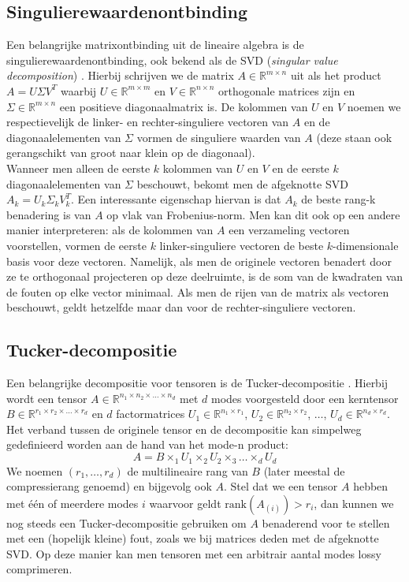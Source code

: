 \subsection{Singulierewaardenontbinding}

Een belangrijke matrixontbinding uit de lineaire algebra is de singulierewaardenontbinding, ook bekend als de SVD (\textit{singular value decomposition}) \cite{ref:svd}. Hierbij schrijven we de matrix $A \in \mathbb{R}^{m \times n}$ uit als het product $A = U \Sigma V^T$ waarbij $U \in \mathbb{R}^{m \times m}$ en $V \in \mathbb{R}^{n \times n}$ orthogonale matrices zijn en $\Sigma \in \mathbb{R}^{m \times n}$ een positieve diagonaalmatrix is. De kolommen van $U$ en $V$ noemen we respectievelijk de linker- en rechter-singuliere vectoren van $A$ en de diagonaalelementen van $\Sigma$ vormen de singuliere waarden van $A$ (deze staan ook gerangschikt van groot naar klein op de diagonaal).\\

Wanneer men alleen de eerste $k$ kolommen van $U$ en $V$ en de eerste $k$ diagonaalelementen van $\Sigma$ beschouwt, bekomt men de afgeknotte SVD $A_k = U_k \Sigma_k V_k^T$. Een interessante eigenschap hiervan is dat $A_k$ de beste rang-k benadering is van $A$ op vlak van Frobenius-norm. Men kan dit ook op een andere manier interpreteren: als de kolommen van $A$ een verzameling vectoren voorstellen, vormen de eerste $k$ linker-singuliere vectoren de beste $k$-dimensionale basis voor deze vectoren. Namelijk, als men de originele vectoren benadert door ze te orthogonaal projecteren op deze deelruimte, is de som van de kwadraten van de fouten op elke vector minimaal. Als men de rijen van de matrix als vectoren beschouwt, geldt hetzelfde maar dan voor de rechter-singuliere vectoren.

\subsection{Tucker-decompositie}

Een belangrijke decompositie voor tensoren is de Tucker-decompositie \cite{ref:tucker}. Hierbij wordt een tensor $A \in \mathbb{R}^{n_1 \times n_2 \times \dots \times n_d}$ met $d$ modes voorgesteld door een kerntensor $B \in \mathbb{R}^{r_1 \times r_2 \times \dots \times r_d}$ en $d$ factormatrices $U_1 \in \mathbb{R}^{n_1 \times r_1}$, $U_2 \in \mathbb{R}^{n_2 \times r_2}$, $\dots$, $U_d \in \mathbb{R}^{n_d \times r_d}$. Het verband tussen de originele tensor en de decompositie kan simpelweg gedefinieerd worden aan de hand van het mode-n product:
\[
A = B \times_1 U_1 \times_2 U_2 \times_3 \dots \times_d U_d
\]
We noemen $(r_1, \dots, r_d)$ de multilineaire rang van $B$ (later meestal de compressierang genoemd) en bijgevolg ook $A$. Stel dat we een tensor $A$ hebben met \'e\'en of meerdere modes $i$ waarvoor geldt $\text{rank}(A_{(i)}) > r_i$, dan kunnen we nog steeds een Tucker-decompositie gebruiken om $A$ benaderend voor te stellen met een (hopelijk kleine) fout, zoals we bij matrices deden met de afgeknotte SVD. Op deze manier kan men tensoren met een arbitrair aantal modes lossy comprimeren.\\

